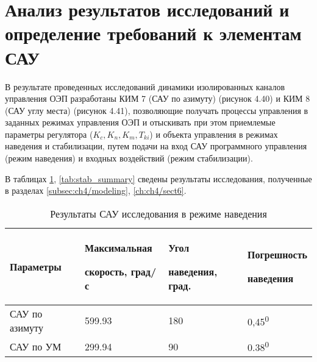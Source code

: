 \section{Анализ результатов исследований и определение требований к элементам САУ} \label{ch:ch4/sect7}

В результате проведенных исследований динамики изолированных каналов управления ОЭП разработаны КИМ 7 (САУ по азимуту) (рисунок 4.40) и КИМ 8 (САУ углу места) (рисунок 4.41), позволяющие получать процессы управления в заданных режимах управления  ОЭП и отыскивать при этом приемлемые параметры регулятора ($K_c, K_n, K_m, T_{ki}$) и объекта управления в режимах наведения и стабилизации, путем подачи на вход САУ программного управления (режим наведения) и входных воздействий (режим стабилизации).\par

В таблицах \ref{tab:aiming_summary}, \ref{tab:stab_summary} сведены результаты исследования, полученные в разделах \ref{subsec:ch4/modeling}, \ref{ch:ch4/sect6}.



\begin{table}[h]
	\centering
	\caption{Результаты САУ исследования в режиме наведения}
	\label{tab:aiming_summary}
	\begin{tabular}{p{1.37in}p{1.47in}p{1.41in}p{1.24in}}
		\hline
		\multicolumn{1}{|p{1.37in}}{Параметры} & 
		\multicolumn{1}{|p{1.47in}}{Максимальная  \par скорость, град/с} & 
		\multicolumn{1}{|p{1.41in}}{Угол \par наведения, град.} & 
		\multicolumn{1}{|p{1.24in}|}{Погрешность \par наведения} \\
		\hline
		\multicolumn{1}{|p{1.37in}}{САУ по азимуту} & 
		\multicolumn{1}{|p{1.47in}}{599.93} & 
		\multicolumn{1}{|p{1.41in}}{180} & 
		\multicolumn{1}{|p{1.24in}|}{0,45\textsuperscript{0}} \\
		\hline
		\multicolumn{1}{|p{1.37in}}{САУ по УМ} & 
		\multicolumn{1}{|p{1.47in}}{299.94} & 
		\multicolumn{1}{|p{1.41in}}{90} & 
		\multicolumn{1}{|p{1.24in}|}{0.38\textsuperscript{0}} \\
		\hline
		
	\end{tabular}
\end{table}




